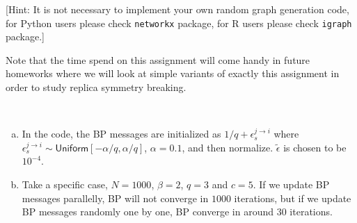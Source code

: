 \documentclass[a4paper,oneside,12pt]{article}
\begin{document}
[Hint: It is not necessary to implement your own random graph generation code, for Python users please check \texttt{networkx} package, for R users please check \texttt{igraph} package.]

Note that the time spend on this assignment will come handy in future homeworks where we will look at simple variants of exactly this assignment in order to study replica symmetry breaking.  

\begin{solution} $\,$ 
\begin{enumerate}[(a)]
\item 
        In the code, the BP messages are initialized as $ 1/q + \epsilon_s^{j \to i} $ where $ \epsilon_s^{j \to i} \sim \mathsf{Uniform}[-\alpha/q, \alpha/q] $, $ \alpha = 0.1 $, and then normalize.
        $ \tilde{\epsilon} $ is chosen to be $ {10}^{-4} $.
\item 
        Take a specific case, $ N = 1000 $, $ \beta = 2 $, $ q = 3 $ and $ c = 5 $.
        If we update BP messages parallelly, BP will not converge in $ 1000 $ iterations, but if we update BP messages randomly one by one, BP converge in around $ 30 $ iterations.


\end{enumerate}
\end{solution}
\end{document}
